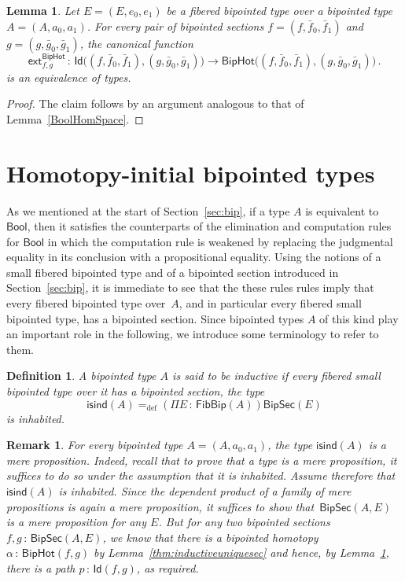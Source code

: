 \documentclass[10pt,a4paper,oneside,reqno]{amsart}
\numberwithin{equation}{section}
\theoremstyle{mythm}
\newtheorem{lemma}[theorem]{Lemma}
\theoremstyle{mydef}
\newtheorem{definition}[theorem]{Definition}
\theoremstyle{myrmk}
\newtheorem{remark}[theorem]{Remark}
\newcommand{\ie}{\text{i.e.\ }}
\newcommand{\defeq}{=_{\mathrm{def}}}
\newcommand{\co}{\,{:}\,}
\newcommand{\isbipind}{\mathsf{isind}}
\newcommand{\ext}{\mathsf{ext}}
\newcommand{\Bool}{\mathsf{Bool}}
\newcommand{\Id}{\mathsf{Id}}
\newcommand{\BipHot}{\mathsf{BipHot}}
\newcommand{\FibBip}{\mathsf{FibBip}}
\newcommand{\BipSec}{\mathsf{BipSec}}
\begin{document}
\begin{lemma} \label{thm:biphot}
Let $E = (E, e_0, e_1)$ be a fibered bipointed type over a bipointed type $A = (A, a_0, a_1)$. 
For every pair of bipointed sections $f = (f, \bar{f}_0, \bar{f}_1)$ and $g = (g, \bar{g}_0, \bar{g}_1)$, 
the canonical function
\[
\ext^{\BipHot}_{f,g} \co \Id\big( (f, \bar{f}_0, \bar{f}_1), (g, \bar{g}_0, \bar{g}_1) \big) \rightarrow
\BipHot \big( (f, \bar{f}_0, \bar{f}_1), (g, \bar{g}_0, \bar{g}_1) \big) \, .
\]
is an equivalence of types. 
\end{lemma}


\begin{proof} The claim follows by an argument analogous to that of Lemma~\ref{BoolHomSpace}.
\end{proof}







\section{Homotopy-initial bipointed types} 
\label{sec:homibt}


As we mentioned at the start of Section~\ref{sec:bip}, if a type $A$ is equivalent to $\Bool$, then 
it satisfies the counterparts of the elimination and computation rules for $\Bool$ in which the computation rule is 
weakened by replacing the judgmental equality in its conclusion with a propositional equality. Using the notions of a small fibered bipointed type and of a bipointed section introduced in Section~\ref{sec:bip}, it is immediate to see that the these rules rules imply that every fibered bipointed type over~$A$, and in particular every fibered small bipointed type, has a bipointed section. 
Since bipointed types $A$ of this kind  play an important role in the following, we introduce some terminology to refer to them.


 



\begin{definition} A bipointed type $A$ is said to be \emph{inductive} if every fibered small bipointed type over it has a bipointed section, \ie the type
\[ 
\isbipind(A) \defeq (\Pi E \co \FibBip(A))  \BipSec(E)
\]  
is inhabited. \end{definition} 



\begin{remark} For every bipointed type $A = (A, a_0, a_1)$, the type $\isbipind(A)$ is a mere proposition. Indeed, recall that to prove that a type  is a mere proposition, it suffices to do so under the assumption that it is inhabited. Assume therefore that~$\isbipind(A)$ is inhabited. Since the dependent product of a family of mere propositions is again a mere proposition, it suffices to show that~$\BipSec(A,E)$ is a mere proposition for any $E$. But for any two bipointed sections~$f, g \co \BipSec(A,E)$, we know that there is a 
bipointed homotopy $\alpha \co \BipHot(f,g)$ by Lemma~\ref{thm:inductiveuniquesec} and hence, by 
Lemma~\ref{thm:biphot}, there is a path $p \co \Id(f,g)$, as required. 
\end{remark}
\end{document}

